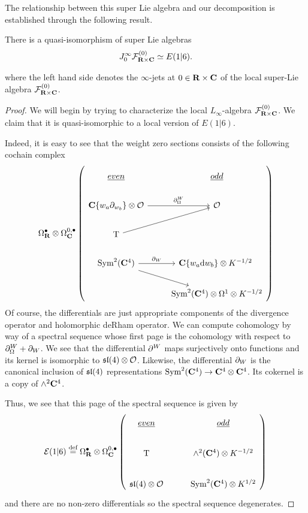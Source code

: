\documentclass[../main.tex]{subfiles}
\begin{document}
The relationship between this super Lie algebra and our decomposition is established through the following result.



\begin{prop}
There is a quasi-isomorphism of super Lie algebras
\[
J^\infty_0\mathcal{F}^{(0)}_{\mathbf{R}\times \mathbf{C}} \simeq E(1|6).
\]
\end{prop}
where the left hand side denotes the $\infty$-jets at $0\in \mathbf{R}\times \mathbf{C}$ of the local super-Lie algebra $\mathcal{F}^{(0)}_{\mathbf{R}\times \mathbf{C}}$. 
\begin{proof}
We will begin by trying to characterize the local $L_\infty$-algebra $\mathcal{F}^{(0)}_{\mathbf{R}\times \mathbf{C}}$. We claim that it is quasi-isomorphic to a local version of $E(1|6)$. 

Indeed, it is easy to see that the weight zero sections consists of the following cochain complex 
\begin{equation}
\Omega^\bullet _\R \otimes \Omega^{0,\bullet}_\C \left (
\begin{tikzcd}
\ul{even} & \ul{odd} \\
\C\{w_a\del_{w_b}\}\otimes \mc O\ar[r, "\del^W_\Omega"]  & \mc O \\ 
\T \ar[ur] & \\
\Sym^2 (\C^4)\ar[r, "\del_W"]\ar[dr] & \C\{w_a\d w_b\} \otimes K^{-1/2}\ \\
& \Sym^2 (\C^4)\otimes \Omega^1\otimes K^{-1/2}
\end{tikzcd} \right)
\end{equation}
Of course, the differentials are just appropriate components of the divergence operator and holomorphic deRham operator. We can compute cohomology by way of a spectral sequence whose first page is the cohomology with respect to $\partial^W_\Omega + \partial_W$. We see that the differential $\partial^W$ maps surjectively onto functions and its kernel is isomorphic to $\mathfrak{sl}(4)\otimes \mathcal{O}$. Likewise, the differential $\partial_W$ is the canonical inclusion of $\mathfrak{sl}(4)$ representations $\text{Sym}^2 (\mathbf{C}^4)\to \mathbf{C}^4\otimes \mathbf{C}^4$. Its cokernel is a copy of $\wedge^2 \mathbf{C}^4$. 

Thus, we see that this page of the spectral sequence is given by
\begin{equation}
\mc E(1|6) \define \Omega^\bullet _\R \otimes \Omega^{0,\bullet}_\C \left (
\begin{tikzcd}
\ul{even} & \ul{odd} \\
\T & \wedge^2 (\C^4) \otimes K^{-1/2} \\
\mf {sl}(4)\otimes \mc O & \Sym^2 (\C^4)\otimes K^{1/2}
\end{tikzcd} \right)
\end{equation}
and there are no non-zero differentials so the spectral sequence degenerates.


\end{proof}
\end{document}
